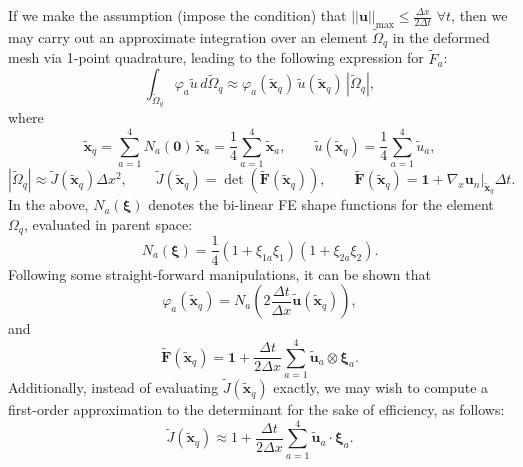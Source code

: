 \documentclass[12pt]{article}
\begin{document}
If we make the assumption (impose the condition) that $|| \mathbf{u} ||_{\max} \leq \frac{\Delta x}{2 \Delta t} \, \, \forall t$, then we may carry out an approximate integration over an element $\tilde{\Omega}_q$ in the deformed mesh via 1-point quadrature, leading to the following expression for $\tilde{F}_{a}$:
\begin{equation}
  \int_{\tilde{\Omega}_q} \varphi_a \tilde{u} \, d \tilde{\Omega}_q \approx \varphi_a (\tilde{\mathbf{x}}_q) \, \tilde{u} (\tilde{\mathbf{x}}_q) \, |\tilde{\Omega}_q|,
\end{equation}
where
\begin{equation}
  \tilde{\mathbf{x}}_q = \sum_{a=1}^4 N_a (\mathbf{0}) \, \tilde{\mathbf{x}}_a = \frac{1}{4} \sum_{a=1}^4 \tilde{\mathbf{x}}_a, \qquad \tilde{u} (\tilde{\mathbf{x}}_q) = \frac{1}{4} \sum_{a=1}^4 \tilde{u}_a,
\end{equation}
\begin{equation}
  |\tilde{\Omega}_q| \approx \tilde{J} (\tilde{\mathbf{x}}_q) \Delta x^2, \qquad \tilde{J} (\tilde{\mathbf{x}}_q) = \det (\tilde{\mathbf{F}} (\tilde{\mathbf{x}}_q)), \qquad \tilde{\mathbf{F}} (\tilde{\mathbf{x}}_q) = \mathbf{1} + \left. \nabla_{x} \mathbf{u}_n \right|_{\tilde{\mathbf{x}}_q} \Delta t.
\end{equation}
In the above, $N_a (\boldsymbol{\xi})$ denotes the bi-linear FE shape functions for the element $\Omega_q$, evaluated in parent space:
\begin{equation}
  N_a (\boldsymbol{\xi}) = \frac{1}{4} (1 + \xi_{1a} \xi_{1}) (1 + \xi_{2a} \xi_{2}).
\end{equation}
Following some straight-forward manipulations, it can be shown that
\begin{equation}
  \varphi_a (\tilde{\mathbf{x}}_q) = N_a \left( 2 \frac{\Delta t}{\Delta x} \tilde{\mathbf{u}} (\tilde{\mathbf{x}}_q) \right),
\end{equation}
and
\begin{equation}
  \tilde{\mathbf{F}} (\tilde{\mathbf{x}}_q) = \mathbf{1} + \frac{\Delta t}{2 \Delta x} \sum_{a=1}^4 \tilde{\mathbf{u}}_a \otimes \boldsymbol{\xi}_a.
\end{equation}
Additionally, instead of evaluating $\tilde{J} (\tilde{\mathbf{x}}_q)$ exactly, we may wish to compute a first-order approximation to the determinant for the sake of efficiency, as follows:
\begin{equation}
  \tilde{J} (\tilde{\mathbf{x}}_q) \approx 1 + \frac{\Delta t}{2 \Delta x} \sum_{a=1}^4 \tilde{\mathbf{u}}_a \cdot \boldsymbol{\xi}_a.
\end{equation}
\end{document}
